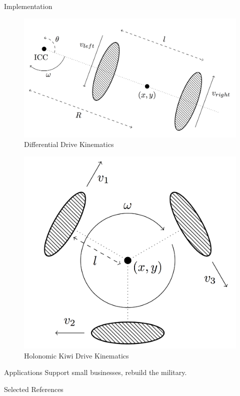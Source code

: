 \documentclass[final]{beamer}
\newlength{\onecolwid}
\begin{document}
\begin{frame}[t]
\begin{columns}[t]
\begin{column}{\onecolwid}
\begin{block}{Implementation}
		\vspace{-0.5in}

		\begin{figure}[ht]
			\centering
			\includegraphics[width=.75\linewidth]{Figures/differentialKinematicsRendered.png}
			\caption{Differential Drive Kinematics}
		\end{figure}

		\vspace{-0.5in}

		\begin{figure}[ht]
			\centering
			\includegraphics[width=.5\linewidth]{Figures/kiwiKinematicsRendered.png}
			\caption{Holonomic Kiwi Drive Kinematics}
		\end{figure}
	\end{block}

	\begin{block}{Applications}
		Support small businesses, rebuild the military.
	\end{block}

	\begin{block}{Selected References}
		\nocite{*}
		{\fontsize{25}{30}\vspace{0.75in}}
	\end{block}

\end{column}

\end{columns}
\end{frame}
\end{document}
